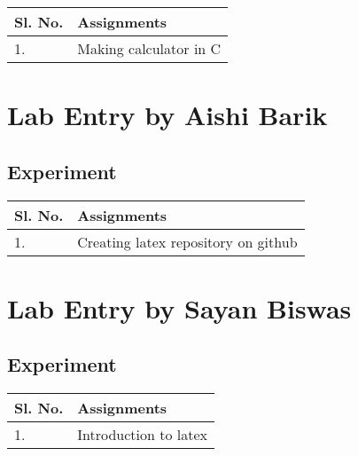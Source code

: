 \documentclass[a4paper,12pt]{article}
\begin{document}
\vspace{0.5cm}
\begin{table}[ht]
\centering
\begin{tabular}{|p{50pt}|p{200pt}|}
\hline
\textbf{Sl. No.} & \textbf{Assignments} \\ \hline
1. & Making calculator in C  \\ \hline
\end{tabular}
\end{table}

\newpage

\usetikzlibrary{calc}

\section{Lab Entry by Aishi Barik}
\subsection{Experiment}

\vspace{0.5cm}
\begin{table}[ht]
\centering
\begin{tabular}{|p{50pt}|p{200pt}|}
\hline
\textbf{Sl. No.} & \textbf{Assignments} \\ \hline
1. & Creating latex repository on github \\ \hline
\end{tabular}
\end{table}

\vspace{2.5cm}
\section{Lab Entry by Sayan Biswas}
\subsection{Experiment}

\vspace{0.5cm}
\begin{table}[ht]
\centering
\begin{tabular}{|p{50pt}|p{200pt}|}
\hline
\textbf{Sl. No.} & \textbf{Assignments} \\ \hline
1. & Introduction to latex \\ \hline
\end{tabular}
\end{table}
\end{document}
